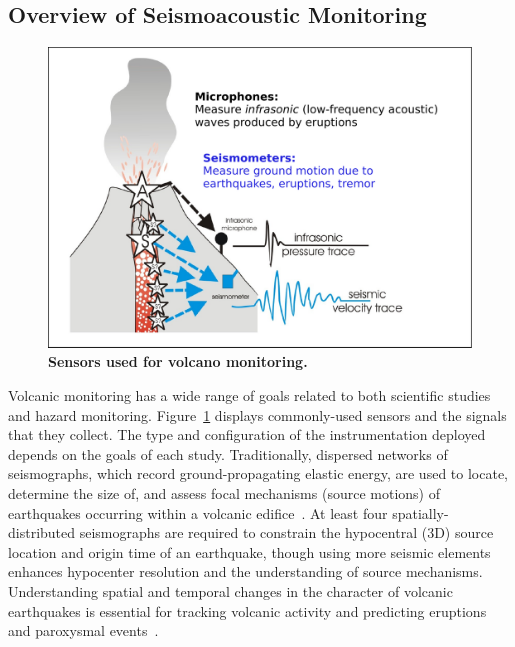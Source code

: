 \subsection{Overview of Seismoacoustic Monitoring}

\begin{figure}[t]
\begin{center}
\includegraphics[width=0.9\hsize]{./2-related/figs/NewCartoon.pdf}
\end{center}
\caption{\textbf{Sensors used for volcano monitoring.}}
\label{introduction-fig-cartoon}
\end{figure}

Volcanic monitoring has a wide range of goals related to both scientific
studies and hazard monitoring. Figure~\ref{introduction-fig-cartoon} displays
commonly-used sensors and the signals that they collect. The type and
configuration of the instrumentation deployed depends on the goals of each
study. Traditionally, dispersed networks of seismographs, which record
ground-propagating elastic energy, are used to locate, determine the size of,
and assess focal mechanisms (source motions) of earthquakes occurring within
a volcanic edifice~\cite{Chouet03}. At least four spatially-distributed
seismographs are required to constrain the hypocentral (3D) source location
and origin time of an earthquake, though using more seismic elements enhances
hypocenter resolution and the understanding of source mechanisms.
Understanding spatial and temporal changes in the character of volcanic
earthquakes is essential for tracking volcanic activity and predicting
eruptions and paroxysmal events~\cite{McNutt96}.

\vfill\eject

